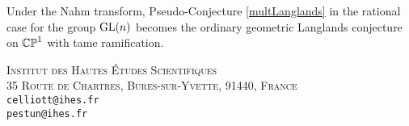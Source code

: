 \documentclass[10pt, oneside]{article}
\begin{document}
\begin{claim}
Under the Nahm transform, Pseudo-Conjecture \ref{multLanglands} in the rational case for the group $\mathrm{GL}(n)$ becomes the ordinary geometric Langlands conjecture on $\mathbb{CP}^1$ with tame ramification.
\end{claim}

 
\pagestyle{bib}



\textsc{Institut des Hautes \'Etudes Scientifiques}\\
\textsc{35 Route de Chartres, Bures-sur-Yvette, 91440, France}\\
\texttt{celliott@ihes.fr}\\ 
\texttt{pestun@ihes.fr}
 
\end{document}
